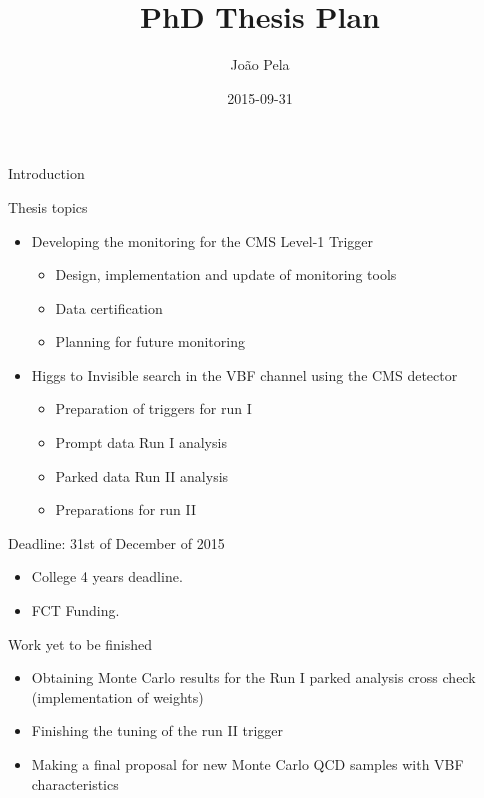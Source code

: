 \documentclass[8pt]{beamer}
\author[J. Pela]{João Pela}
\title{PhD Thesis Plan}
\institute[ICL]{Imperial College London}
\date{2015-09-31}
\begin{document}
\setlength{\unitlength}{1mm}

\begin{frame}
  \titlepage
\end{frame}

\begin{frame}{Introduction}

\begin{block}{Thesis topics}

\begin{itemize}
  \item Developing the monitoring for the CMS Level-1 Trigger
  \begin{itemize}
    \item Design, implementation and update of monitoring tools
    \item Data certification
    \item Planning for future monitoring
  \end{itemize}
  \item Higgs to Invisible search in the VBF channel using the CMS detector
  \begin{itemize}
    \item Preparation of triggers for run I
    \item Prompt data Run I analysis
    \item Parked data Run II analysis
    \item Preparations for run II
  \end{itemize}
\end{itemize}

\end{block}

\begin{block}{Deadline: 31st of December of 2015}

\begin{itemize}
  \item College 4 years deadline.
  \item FCT Funding.
\end{itemize}

\end{block}

\begin{block}{Work yet to be finished}
  
\begin{itemize}
  \item Obtaining Monte Carlo results for the Run I parked analysis cross check (implementation of weights)
  \item Finishing the tuning of the run II trigger
  \item Making a final proposal for new Monte Carlo QCD samples with VBF characteristics
\end{itemize}

\end{block}


\end{frame}
\end{document}

